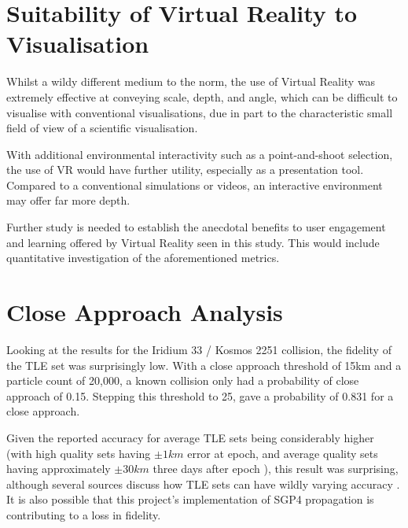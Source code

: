 \documentclass[12pt,openany,a4paper]{book}
\begin{document}
	\section{Suitability of Virtual Reality to Visualisation}
	
	Whilst a wildy different medium to the norm, the use of Virtual Reality was extremely effective at conveying scale, depth, and angle, which can be difficult to visualise with conventional visualisations, due in part to the characteristic small field of view of a scientific visualisation. \newline
	
	With additional environmental interactivity such as a point-and-shoot selection, the use of VR would have further utility, especially as a presentation tool. Compared to a conventional simulations or videos, an interactive environment may offer far more depth. \newline
	
	Further study is needed to establish the anecdotal benefits to user engagement and learning offered by Virtual Reality seen in this study. This would include quantitative investigation of the aforementioned metrics.
		

	
%	


	\section{Close Approach Analysis}
	Looking at the results for the Iridium 33 / Kosmos 2251 collision, the fidelity of the TLE set was surprisingly low. With a close approach threshold of 15km and a particle count of 20,000, a known collision only had a probability of close approach of 0.15. Stepping this threshold to 25, gave a probability of 0.831 for a close approach. \newline
	
	Given the reported accuracy for average TLE sets being considerably higher (with high quality sets having $\pm 1km$ error at epoch, and average quality sets having approximately $\pm 30km$ three days after epoch \cite{agiAcc}), this result was surprising, although several sources discuss how TLE sets can have wildly varying accuracy \cite{agiTLEAcc}. It is also possible that this project's implementation of SGP4 propagation is contributing to a loss in fidelity.
	
\end{document}
